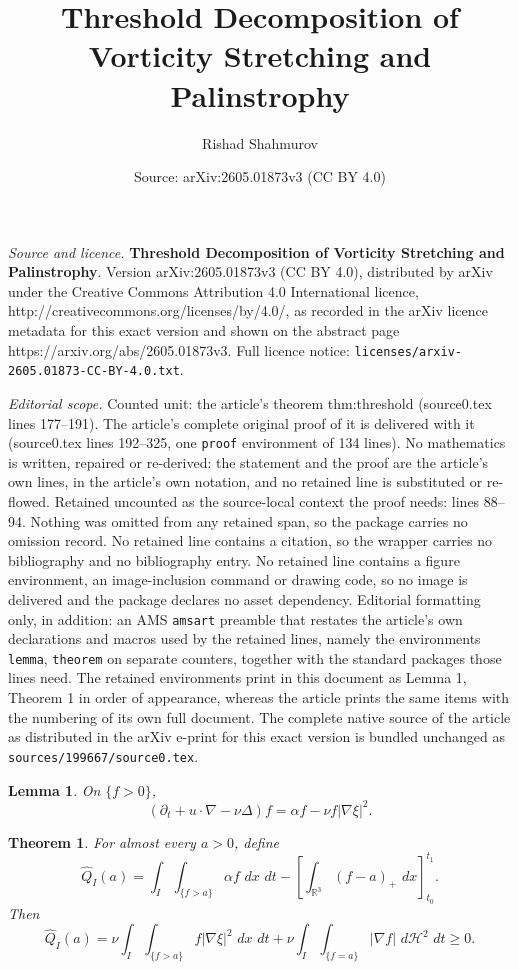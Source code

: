 \documentclass[10pt,a4paper]{amsart}
\title{\textbf{Threshold Decomposition of Vorticity Stretching and Palinstrophy}}
\author{Rishad Shahmurov}
\date{Source: arXiv:2605.01873v3 (CC BY 4.0)}
\newtheorem{lemma}{Lemma}
\newtheorem{theorem}{Theorem}
\newcommand{\Qhat}{\widehat Q}\newcommand{\Qp}{\widehat{\mathfrak Q}}
\newcommand{\R}{\mathbb R}\newcommand{\dd}{\,d}\newcommand{\HH}{\mathcal H}
\begin{document}
\maketitle

\noindent\emph{Source and licence.} \textbf{Threshold Decomposition of Vorticity Stretching and Palinstrophy}. Version arXiv:2605.01873v3 (CC BY 4.0), distributed by arXiv under the Creative Commons Attribution 4.0 International licence, http://creativecommons.org/licenses/by/4.0/, as recorded in the arXiv licence metadata for this exact version and shown on the abstract page https://arxiv.org/abs/2605.01873v3. Full licence notice: \texttt{licenses/arxiv-2605.01873-CC-BY-4.0.txt}.\par\smallskip

\noindent\textit{Editorial scope.} Counted unit: the article's theorem thm:threshold (source0.tex lines 177--191). The article's complete original proof of it is delivered with it (source0.tex lines 192--325, one \texttt{proof} environment of 134 lines). No mathematics is written, repaired or re-derived: the statement and the proof are the article's own lines, in the article's own notation, and no retained line is substituted or re-flowed.  Retained uncounted as the source-local context the proof needs: lines 88--94.  Nothing was omitted from any retained span, so the package carries no omission record.  No retained line contains a citation, so the wrapper carries no bibliography and no bibliography entry.  No retained line contains a figure environment, an image-inclusion command or drawing code, so no image is delivered and the package declares no asset dependency.  Editorial formatting only, in addition: an AMS \texttt{amsart} preamble that restates the article's own declarations and macros used by the retained lines, namely the environments \texttt{lemma}, \texttt{theorem} on separate counters, together with the standard packages those lines need.  The retained environments print in this document as Lemma 1, Theorem 1 in order of appearance, whereas the article prints the same items with the numbering of its own full document.  The complete native source of the article as distributed in the arXiv e-print for this exact version is bundled unchanged as \texttt{sources/199667/source0.tex}.
\begin{lemma}\label{lem:magnitude}
On $\{f>0\}$,
\[
(\partial_t+u\cdot\nabla-\nu\Delta)f
=\alpha f-\nu f|\nabla\xi|^2.
\]
\end{lemma}

\begin{theorem}\label{thm:threshold}
For almost every $a>0$, define
\[
\Qhat_I(a)=\int_I\int_{\{f>a\}}\alpha f\,\dd x\,\dd t
-\left[\int_{\R^3}(f-a)_+\,\dd x\right]_{t_0}^{t_1}.
\]
Then
\[
\boxed{
\Qhat_I(a)=
\nu\int_I\int_{\{f>a\}}f|\nabla\xi|^2\,\dd x\,\dd t
+\nu\int_I\int_{\{f=a\}}|\nabla f|\,\dd\HH^2\,\dd t\ge0.
}
\]
\end{theorem}
\end{document}
